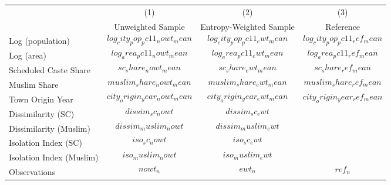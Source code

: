 \begin{tabular}{lccc}
\hline\hline
                         & (1)                             & (2)                            & (3)                            \\
                         & Unweighted Sample               & Entropy-Weighted Sample        & Reference                      \\
\hline
Log (population)         & $$log_city_pop_pc11_nowt_mean$$ & $$log_city_pop_pc11_ewt_mean$$ & $$log_city_pop_pc11_ref_mean$$ \\
Log (area)               & $$log_area_pc11_nowt_mean$$     & $$log_area_pc11_ewt_mean$$     & $$log_area_pc11_ref_mean$$     \\
Scheduled Caste Share    & $$sc_share_nowt_mean$$          & $$sc_share_ewt_mean$$          & $$sc_share_ref_mean$$          \\
Muslim Share             & $$muslim_share_nowt_mean$$      & $$muslim_share_ewt_mean$$      & $$muslim_share_ref_mean$$      \\
Town Origin Year         & $$city_origin_year_nowt_mean$$  & $$city_origin_year_ewt_mean$$  & $$city_origin_year_ref_mean$$  \\
\hline
Dissimilarity (SC)       & $$dissim_sc_nowt$$              & $$dissim_sc_ewt$$              &                                \\
Dissimilarity (Muslim)   & $$dissim_muslim_nowt$$          & $$dissim_muslim_ewt$$          &                                \\
Isolation Index (SC)     & $$iso_sc_nowt$$                 & $$iso_sc_ewt$$                 &                                \\
Isolation Index (Muslim) & $$iso_muslim_nowt$$             & $$iso_muslim_ewt$$             &                                \\
\hline
Observations             & $$nowt_n$$                      & $$ewt_n$$                      & $$ref_n$$                      \\
\hline\hline
\end{tabular}
